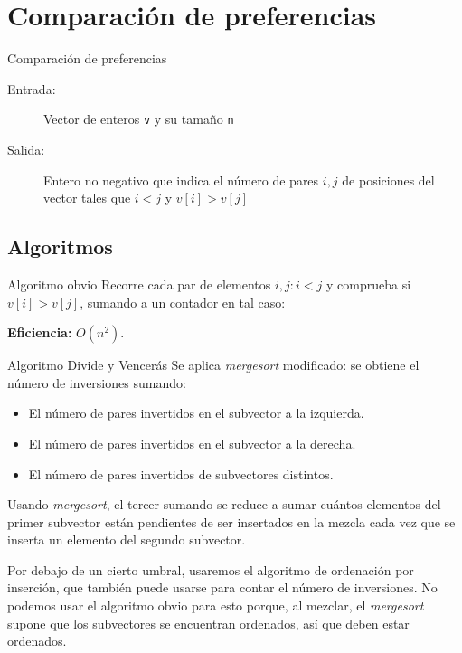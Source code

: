 \section{Comparación de preferencias}

\begin{frame}{Comparación de preferencias}
	\begin{description}
		\item[Entrada:] Vector de enteros \texttt{v} y su tamaño \texttt{n}
		\item[Salida:] Entero no negativo que indica el número de pares $i,j$ de posiciones del vector tales que $i < j$ y $v[i] > v[j]$
	\end{description}
\end{frame}

\subsection{Algoritmos}

\begin{frame}[fragile]{Algoritmo obvio}
	Recorre cada par de elementos $i,j : i < j$ y comprueba si $v[i] > v[j]$, sumando a un contador en tal caso:
	
	\textbf{Eficiencia:} $O(n^2)$.
\end{frame}

\begin{frame}[fragile]{Algoritmo Divide y Vencerás}
	Se aplica \textit{mergesort} modificado: se obtiene el número de inversiones sumando:
	\begin{itemize}
		\item El número de pares invertidos en el subvector a la izquierda.
		\item El número de pares invertidos en el subvector a la derecha.
		\item El número de pares invertidos de subvectores distintos.
	\end{itemize}
	
	\pause
	Usando \textit{mergesort}, el tercer sumando se reduce a sumar cuántos elementos del primer subvector están pendientes de ser insertados en la mezcla cada vez que se inserta un elemento del segundo subvector.
	
	\pause
	
	Por debajo de un cierto umbral, usaremos el algoritmo de ordenación por inserción, que también puede usarse para contar el número de inversiones.
	No podemos usar el algoritmo obvio para esto porque, al mezclar, el \textit{mergesort} supone que los subvectores se encuentran ordenados, así que deben estar ordenados.
\end{frame}

